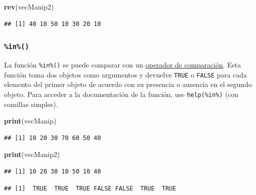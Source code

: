 \documentclass[]{book}
\newenvironment{Shaded}{\begin{snugshade}}{\end{snugshade}}
\newcommand{\KeywordTok}[1]{\textcolor[rgb]{0.13,0.29,0.53}{\textbf{#1}}}
\newcommand{\StringTok}[1]{\textcolor[rgb]{0.31,0.60,0.02}{#1}}
\newcommand{\OperatorTok}[1]{\textcolor[rgb]{0.81,0.36,0.00}{\textbf{#1}}}
\newcommand{\NormalTok}[1]{#1}
\begin{document}
\begin{Shaded}
\begin{Highlighting}[]
\KeywordTok{rev}\NormalTok{(vecManip2)}
\end{Highlighting}
\end{Shaded}

\begin{verbatim}
## [1] 40 10 50 10 30 20 10
\end{verbatim}

\subsubsection{\texorpdfstring{\texttt{\%in\%()}}{\%in\%()}}\label{l015in}

La función \texttt{\%in\%()} se puede comparar con un
\protect\hyperlink{l011opcomp}{operador de comparación}. Esta función
toma dos objetos como argumentos y devuelve \texttt{TRUE} o
\texttt{FALSE} para cada elemento del primer objeto de acuerdo con su
presencia o ausencia en el segundo objeto. Para acceder a la
documentación de la función, use
\texttt{help(\textquotesingle{}\%in\%\textquotesingle{})} (con comillas
simples).

\begin{Shaded}
\begin{Highlighting}[]
\KeywordTok{print}\NormalTok{(vecManip)}
\end{Highlighting}
\end{Shaded}

\begin{verbatim}
## [1] 10 20 30 70 60 50 40
\end{verbatim}

\begin{Shaded}
\begin{Highlighting}[]
\KeywordTok{print}\NormalTok{(vecManip2)}
\end{Highlighting}
\end{Shaded}

\begin{verbatim}
## [1] 10 20 30 10 50 10 40
\end{verbatim}

\begin{Shaded}
\end{Shaded}

\begin{verbatim}
## [1]  TRUE  TRUE  TRUE FALSE FALSE  TRUE  TRUE
\end{verbatim}
\end{document}
